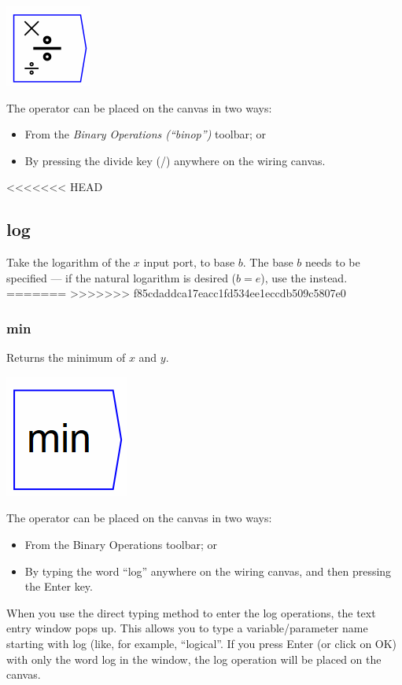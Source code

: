 \includegraphics{images/DivideKey}

The operator can be placed on the canvas in two ways:
\begin{itemize}
\item From the \emph{Binary Operations (``binop'')} toolbar; or 
\item By pressing the divide key (/) anywhere on the wiring canvas. 
\end{itemize}
<<<<<<< HEAD

\subsection{log}\label{Operation:log} Take the logarithm of the $x$
input port, to base $b$. The base $b$ needs to be specified --- if the
natural logarithm is desired ($b=e$), use the  instead.
=======
>>>>>>> f85cdaddca17eacc1fd534ee1eccdb509c5807e0

\subsubsection{min}

\label{Operation:min} Returns the minimum of $x$ and $y$.

\includegraphics{images/minkey}

The operator can be placed on the canvas in two ways:
\begin{itemize}
<<<<<<< HEAD
\item From the Binary Operations toolbar; or
\item By typing the word ``log'' anywhere on the wiring canvas, and then
  pressing the Enter key.
\end{itemize}

When you use the direct typing method to enter the log operations, the
text entry window pops up. This allows you to type a
variable/parameter name starting with log (like, for example,
``logical''. If you press Enter (or click on OK) with only the word log
in the window, the log operation will be placed on the canvas.

